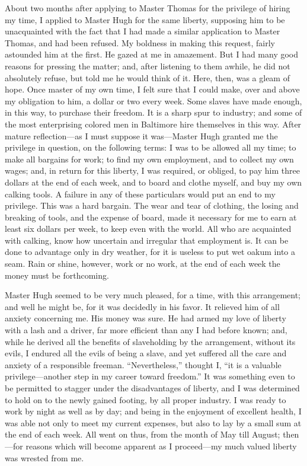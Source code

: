 About two months after applying to Master Thomas for the privilege of
hiring my time, I applied to Master Hugh for the same liberty, supposing
him to be unacquainted with the fact that I had made a {}similar
application to Master Thomas, and had been refused. My boldness in
making this request, fairly astounded him at the first. He gazed at me
in amazement. But I had many good reasons for pressing the matter; and,
after listening to them awhile, he did not absolutely refuse, but told
me he would think of it. Here, then, was a gleam of hope. Once master of
my own time, I felt sure that I could make, over and above my obligation
to him, a dollar or two every week. Some slaves have made enough, in
this way, to purchase their freedom. It is a sharp spur to industry; and
some of the most enterprising colored men in Baltimore hire themselves
in this way. After mature reflection---as I must suppose it was---Master
Hugh granted me the privilege in question, on the following terms: I was
to be allowed all my time; to make all bargains for work; to find my own
employment, and to collect my own wages; and, in return for this
liberty, I was required, or obliged, to pay him three dollars at the end
of each week, and to board and clothe myself, and buy my own calking
tools. A failure in any of these particulars would put an end to my
privilege. This was a hard bargain. The wear and tear of clothing, the
losing and breaking of tools, and the expense of board, made it
necessary for me to earn at least six dollars per week, to keep even
with the world. All who are acquainted with calking, know how uncertain
and irregular that employment is. It can be done to advantage only in
dry weather, for it is useless to put wet oakum into a seam. Rain or
shine, however, work or no work, at the end of each week the money must
be forthcoming.

{}Master Hugh seemed to be very much pleased, for a time, with this
arrangement; and well he might be, for it was decidedly in his favor. It
relieved him of all anxiety concerning me. His money was sure. He had
armed my love of liberty with a lash and a driver, far more efficient
than any I had before known; and, while he derived all the benefits of
slaveholding by the arrangement, without its evils, I endured all the
evils of being a slave, and yet suffered all the care and anxiety of a
responsible freeman. ``Nevertheless,'' thought I, ``it is a valuable
privilege---another step in my career toward freedom.'' It was something
even to be permitted to stagger under the disadvantages of liberty, and
I was determined to hold on to the newly gained footing, by all proper
industry. I was ready to work by night as well as by day; and being in
the enjoyment of excellent health, I was able not only to meet my
current expenses, but also to lay by a small sum at the end of each
week. All went on thus, from the month of May till August; then---for
reasons which will become apparent as I proceed---my much valued liberty
was wrested from me.

